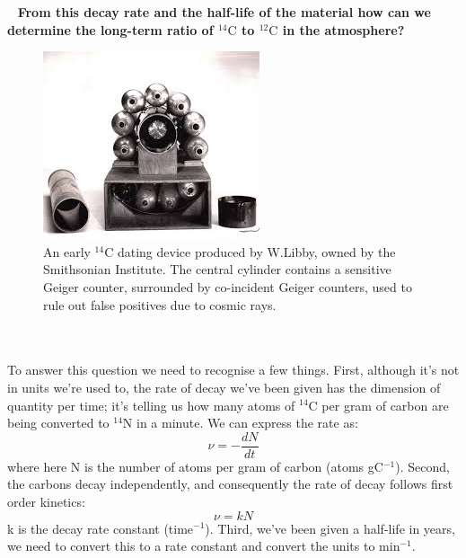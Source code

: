\documentclass[	DIV=calc,%
							paper=a4,%
							fontsize=11pt,%
							twocolumn]{scrartcl}	 					%
\begin{document}
~
\newline
\textbf{From this decay rate and the half-life of the material how can we determine the long-term ratio of $^{14}\mathrm{C}$ to $^{12}\mathrm{C}$ in the atmosphere?}

\begin{figure}
    \centering
    \includegraphics{libby.jpeg}
    \captionsetup{format=plain}
    \caption{An early $^{14}$C dating device produced by W.Libby, owned by the Smithsonian Institute. The central cylinder contains a sensitive Geiger counter, surrounded by co-incident Geiger counters, used to rule out false positives due to cosmic rays.}
    \label{fig:device}
\end{figure}
\\
\\
To answer this question we need to recognise a few things. First, although it's not in units we're used to, the rate of decay we've been given has the dimension of quantity per time; it's telling us how many atoms of $^{14}\mathrm{C}$ per gram of carbon are being converted to $^{14}\mathrm{N}$ in a minute. We can express the rate as:
\begin{equation}
    \nu = -\frac{dN}{dt}
\end{equation}
where here N is the number of atoms per gram of carbon (atoms gC$^{-1}$). Second, the carbons decay independently, and consequently the rate of decay follows first order kinetics:
\begin{equation}
    \nu = kN 
\end{equation}
k is the decay rate constant (time$^{-1}$).
Third, we've been given a half-life in years, we need to convert this to a rate constant and convert the units to min$^{-1}$.
\end{document}

